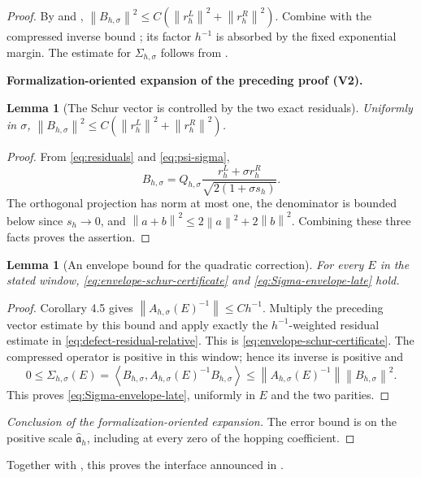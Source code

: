 \documentclass[11pt]{article}
\newtheorem{lemma}[theorem]{Lemma}
\newcommand{\formalisationparentid}{X}
\newenvironment{formalisationaddition}[1]{\par\medskip\begingroup\color{blue}\def\formalisationparentid{#1}\setcounter{formalizationsublemma}{0}\let\lemma\formalizationsublemma\let\endlemma\endformalizationsublemma
  \def\Eo{\mathcal E_h^\circ}\def\EE{\mathcal E_h}\def\phio{\phi_h^\circ}\def\phih{\phi_h}\def\Ho{H_h^{\rm atom}(v^\circ)}\def\Ha{H_h^{\rm atom}}\def\HL{H_h^{L}}\def\Dh{D_h}\def\Log{\operatorname{Log}}\def\ellh{\ell_h}\def\Gp{G_{p,h}}\def\Ast{A_{*,h}}\def\ahat{\widehat{\mathfrak a}_h}\def\ah{\mathfrak a_h}\def\rh{\widehat\rho_h}\def\deltah{\widehat\delta_h}\def\oldref##1{\textup{(##1)}}\def\interface##1{\par\noindent\textit{Analytical interface used here.} ##1\par}\def\finish{\par\noindent\textit{Conclusion of the formalization-oriented expansion.} }\par\noindent\textbf{Formalization-oriented expansion of the preceding proof (V2).}\par\smallskip
}{\par\endgroup\medskip
}
\newcommand{\norm}[1]{\left\|#1\right\|}
\newcommand{\ip}[2]{\left\langle #1,#2\right\rangle}
\begin{document}
\begin{proof}
By  and ,
$\norm{B_{h,\sigma}}^2\le
C(\norm{r_h^L}^2+\norm{r_h^R}^2)$.  Combine
 with the compressed inverse bound
; its factor $h^{-1}$ is absorbed by the
fixed exponential margin.  The estimate for $\Sigma_{h,\sigma}$ follows from
.

\begin{formalisationaddition}{C8.4}
\begin{lemma}[The Schur vector is controlled by the two exact residuals]\label{sublemma:C8-4-vector}
Uniformly in $\sigma$, $\norm{B_{h,\sigma}}^2\le C(\norm{r_h^L}^2+\norm{r_h^R}^2)$.
\end{lemma}
\begin{proof}
From \eqref{eq:residuals} and \eqref{eq:psi-sigma},
\[
 B_{h,\sigma}=Q_{h,\sigma}
 \frac{r_h^L+\sigma r_h^R}{\sqrt{2(1+\sigma s_h)}}.
\]
The orthogonal projection has norm at most one, the denominator is bounded below since $s_h\to0$, and $\norm{a+b}^2\le2\norm a^2+2\norm b^2$. Combining these three facts proves the assertion.
\end{proof}

\begin{lemma}[An envelope bound for the quadratic correction]\label{sublemma:C8-4-correction}
For every $E$ in the stated window, \eqref{eq:envelope-schur-certificate} and \eqref{eq:Sigma-envelope-late} hold.
\end{lemma}
\begin{proof}
Corollary 4.5 gives $\norm{A_{h,\sigma}(E)^{-1}}\le C h^{-1}$. Multiply the preceding vector estimate by this bound and apply exactly the $h^{-1}$-weighted residual estimate in \eqref{eq:defect-residual-relative}. This is \eqref{eq:envelope-schur-certificate}. The compressed operator is positive in this window; hence its inverse is positive and
\[
 0\le\Sigma_{h,\sigma}(E)
 =\ip{B_{h,\sigma}}{A_{h,\sigma}(E)^{-1}B_{h,\sigma}}
 \le\norm{A_{h,\sigma}(E)^{-1}}\norm{B_{h,\sigma}}^2.
\]
This proves \eqref{eq:Sigma-envelope-late}, uniformly in $E$ and the two parities.
\end{proof}
\finish The error bound is on the positive scale $\ahat$, including at every zero of the hopping coefficient.
\end{formalisationaddition}

\end{proof}

Together with , this proves the
interface  announced in
.
\end{document}

